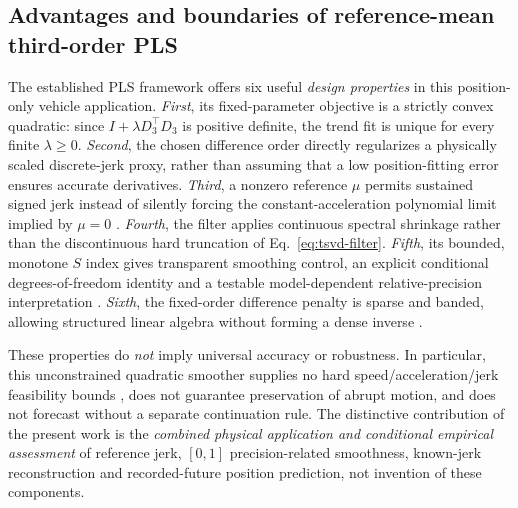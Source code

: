 \subsection{Advantages and boundaries of reference-mean third-order PLS}
\label{sec:pls-advantages}
The established PLS framework offers six
useful \emph{design properties} in this
position-only vehicle application.
\emph{First}, its fixed-parameter objective
is a strictly convex quadratic: since
$I+\lambda D_3^\top D_3$ is positive
definite, the trend fit is unique for
every finite $\lambda\ge0$.
\emph{Second}, the chosen difference
order directly regularizes a physically
scaled discrete-jerk proxy, rather than
assuming that a low position-fitting
error ensures accurate derivatives.
\emph{Third}, a nonzero reference $\mu$
permits sustained signed jerk instead of
silently forcing the constant-acceleration
polynomial limit implied by $\mu=0$
\citep{guerrero2007}.
\emph{Fourth}, the filter applies
continuous spectral shrinkage rather
than the discontinuous hard truncation
of Eq.~\eqref{eq:tsvd-filter}.
\emph{Fifth}, its bounded, monotone
$S$ index gives transparent smoothing
control, an explicit conditional
degrees-of-freedom identity and a
testable model-dependent relative-precision
interpretation \citep{guerrero2007,guerrero2008,cortes2017}.
\emph{Sixth}, the fixed-order difference
penalty is sparse and banded, allowing
structured linear algebra without
forming a dense inverse
\citep{weinert2007,biessy2026}.

These properties do \emph{not}
imply universal accuracy or robustness.
In particular, this unconstrained
quadratic smoother supplies no hard
speed/acceleration/jerk feasibility
bounds \citep{fan2024}, does not
guarantee preservation of abrupt motion,
and does not forecast without a
separate continuation rule.
The distinctive contribution of
the present work is the \emph{combined
physical application and conditional
empirical assessment} of reference
jerk, $[0,1]$ precision-related
smoothness, known-jerk reconstruction
and recorded-future position prediction,
not invention of these components.

